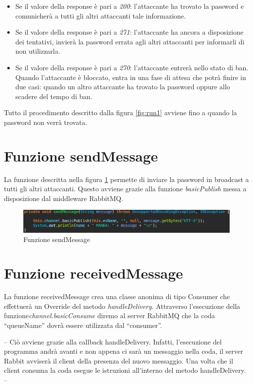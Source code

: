 \documentclass[a4paper,12pt,titlepage,oneside,openany]{book}
\begin{document}
\begin{itemize}
	\item Se il valore della response è pari a \textit{200}: l'attaccante ha trovato la password e comunicherà a tutti gli altri attaccanti tale informazione.
	\item Se il valore della response è pari a \textit{271}: l'attaccante ha ancora a disposizione dei tentativi, invierà la password errata agli altri attaccanti per informarli di non utilizzarla.
	\item Se il valore della response è pari a \textit{270}: l'attaccante entrerà nello stato di ban. Quando l'attaccante è bloccato, entra in una fase di attesa che potrà finire in due casi: quando un altro attaccante ha trovato la password oppure allo scadere del tempo di ban.
\end{itemize}
Tutto il procedimento descritto dalla figura \ref{fig:run1} avviene fino a quando la password non verrà trovata.
\section{Funzione sendMessage}
La funzione descritta nella figura \ref{fig:sendMessage} permette di inviare la password in broadcast a tutti gli altri attaccanti. Questo avviene grazie alla funzione \textit{basicPublish} messa a disposizione dal middleware RabbitMQ.
\begin{figure}[H]
	\centering
	\includegraphics[scale=0.5]{sendMessage.png}
	\caption{Funzione sendMessage}
	\label{fig:sendMessage}
\end{figure}
\section{Funzione receivedMessage}
La funzione receivedMessage crea una classe anonima di tipo Consumer che effettuerà un Override del metodo \textit{handleDelivery}. Attraverso l'esecuzione della funzione\textit{channel.basicConsume} diremo al server RabbitMQ che la coda “queueName” dovrà essere utilizzata dal “consumer”.

--
Ciò avviene grazie alla callback handleDelivery. Infatti, l'esecuzione del programma andrà avanti e non appena ci sarà un messaggio nella coda, il server Rabbit avviserà il client della presenza del nuovo messaggio. Una volta che il client consuma la coda esegue le istruzioni all'interno del metodo handleDelivery.
--
\end{document}
